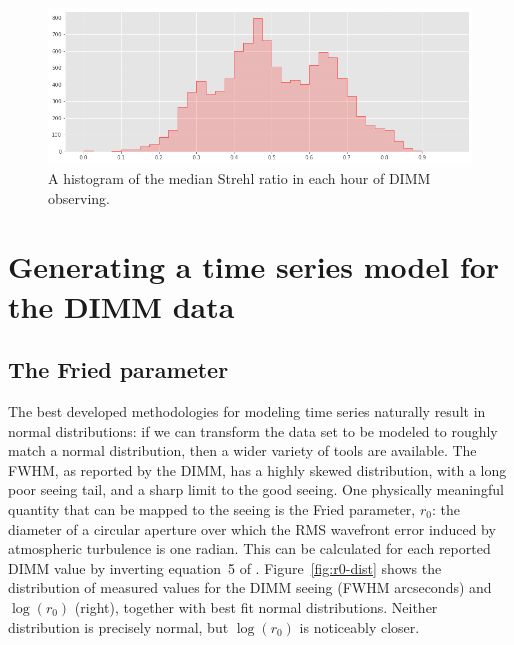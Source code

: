 \documentclass[DM,authoryear,toc]{lsstdoc}
\begin{document}
\begin{figure}
  \includegraphics[width=\columnwidth]{./figures/strehl_hist.png}
  \caption{
    A histogram of the median Strehl ratio in each hour of DIMM observing.
  }
  \label{fig:strehl-hist}
\end{figure}

\section{Generating a time series model for the DIMM data}

\subsection{The Fried parameter}

The best developed methodologies for modeling time series naturally
result in normal distributions: if we can transform the data set to be
modeled to roughly match a normal distribution, then a wider variety
of tools are available. The FWHM, as reported by the DIMM, has a
highly skewed distribution, with a long poor seeing tail, and a sharp
limit to the good seeing. One physically meaningful quantity that can
be mapped to the seeing is the Fried parameter, $r_{0}$: the diameter of a
circular aperture over which the RMS wavefront error induced by
atmospheric turbulence is one radian. This can be calculated for each
reported DIMM value by inverting equation~5 of
\cite{2002PASP..114.1156T}.  Figure~\ref{fig:r0-dist} shows the
distribution of measured values for the DIMM seeing (FWHM arcseconds)
and $\log(r_0)$ (right), together with best fit normal
distributions. Neither distribution is precisely normal, but $\log(
r_0)$ is noticeably closer.
\end{document}
